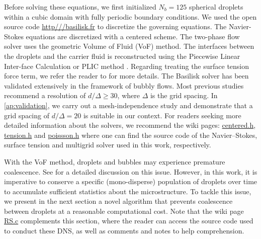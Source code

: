 Before solving these equations, we first initialized $N_b = 125$ spherical droplets within a cubic domain with fully periodic boundary conditions. 
We used the open source code \url{http///basilisk.fr} to discretize the governing equations. 
The Navier-Stokes equations are discretized with a centered scheme.
The two-phase flow solver uses the geometric Volume of Fluid (VoF) method. 
The interfaces between the droplets and the carrier fluid is reconstructed using the Piecewise Linear Inter-face Calculation or PLIC method \citet[Chapter 5.]{tryggvason2011direct}.
Regarding treating the surface tension force term, we refer the reader to \citet{popinet2018numerical} for more details. 
The Basilisk solver has been validated extensively in the framework of bubbly flows. 
Most previous studies \citep{hidman2023assessing,innocenti2020direct} recommend a resolution of $d/\Delta \ge  30$, where $\Delta$ is the grid spacing. 
In \ref{ap:validation}, we carry out a mesh-independence study and demonstrate that a grid spacing of $d/\Delta = 20$ is suitable in our context.
For readers seeking more detailed information about the solvers, we recommend the wiki pages: \href{http://basilisk.fr/src/navier-stokes/centered.h}{centered.h}, \href{http://basilisk.fr/src/tension.h}{tension.h} and \href{http://basilisk.fr/src/poissson.h}{poissson.h} where one can find the source code of the Navier--Stokes, surface tension and multigrid solver used in this work, respectively. 

With the VoF method, droplets and bubbles may experience premature coalescence.
See \citet[Appendix B]{innocenti2020direct} for a detailed discussion on this issue.
However, in this work, it is imperative to conserve a specific (mono-disperse) population of droplets over time to accumulate sufficient statistics about the microstructure.
To tackle this issue, we present in the next section a novel algorithm that prevents coalescence between droplets at a reasonable computational cost. 
Note that the wiki page \href{http://basilisk.fr/sandbox/fintzin/Rising-suspension/RS.c}{RS.c} complements this section, where the reader can access the source code used to conduct these DNS, as well as comments and notes to help comprehension. 




